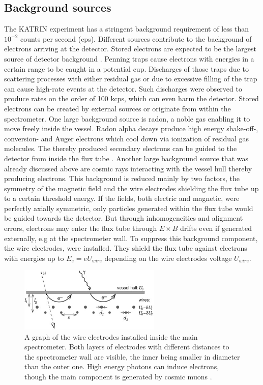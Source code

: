       \subsection{Background sources}
      \label{ch:The KATRIN experiment:sec:Experimental setup:subsec:BackgroundSources}
      The KATRIN experiment has a stringent background requirement of less than $10^{-2}$ counts per second (cps).
      Different sources contribute to the background of electrons arriving at the detector. Stored electrons are expected to be the largest source of detector background \cite{storedElectrons}. Penning traps cause electrons with energies in a certain range to be caught in a potential cup. Discharges of those traps due to scattering processes with either residual gas or due to excessive filling of the trap can cause high-rate events at the detector. Such discharges were observed to produce rates on the order of 100 kcps, which can even harm the detector. Stored electrons can be created by external sources or originate from within the spectrometer. One large background source is radon, a noble gas enabling it to move freely inside the vessel. Radon alpha decays produce high energy shake-off-, conversion- and Auger electrons which cool down via ionization of residual gas molecules. The thereby produced secondary electrons can be guided to the detector from inside the flux tube \cite{radonGoerhard, radonWandkowsky}.
      Another large background source that was already discussed above are cosmic rays interacting with the vessel hull thereby producing electrons. This background is reduced mainly by two factors, the symmetry of the magnetic field and the wire electrodes shielding the flux tube up to a certain threshold energy.
      If the fields, both electric and magnetic, were perfectly axially symmetric, only particles generated within the flux tube would be guided towards the detector. But through inhomogeneities and alignment errors, electrons may enter the flux tube through $E\times B$ drifts even if generated externally, e.g at the spectrometer wall. To suppress this background component, the wire electrodes, were installed. They shield the flux tube against electrons with energies up to $E_e = eU_{wire}$ depending on the wire electrodes voltage $U_{wire}$. 
      \begin{figure}
		\centering
		\includegraphics[width = 0.6\textwidth]{graphics/katrinExperiment/wireElectrodes.jpg}
		\caption[Wire Electrodes]{A graph of the wire electrodes installed inside the main spectrometer. Both layers of electrodes with different distances to the spectrometer wall are visible, the inner being smaller in diameter than the outer one. High energy photons can induce electrons, though the main component is generated by cosmic muons \cite{wireElectrodeSystem}.}
	  \end{figure}